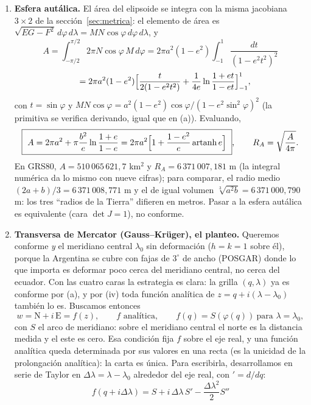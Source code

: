 \begin{enumerate}[label=(\alph*)]
  \(y=S(\varphi)\), el arco de meridiano del capítulo~\ref{cap:elipsoide}. Ni
  conforme ni equivalente: \(\sigma_1=k\), \(\sigma_2=1\).
  \item \textbf{Esfera autálica.} El área del elipsoide se integra con la misma jacobiana
  \(3\times2\) de la sección~\ref{sec:metrica}: el elemento de área es
  \(\sqrt{EG-F^2}\,d\varphi\,d\lambda=MN\cos\varphi\,d\varphi\,d\lambda\), y
  \[
    A=\int_{-\pi/2}^{\pi/2}2\pi N\cos\varphi\,M\,d\varphi
    =2\pi a^2(1-e^2)\int_{-1}^{1}\frac{dt}{(1-e^2t^2)^2}
  \]
  \[
    \phantom{A}=2\pi a^2(1-e^2)\Bigl[\frac{t}{2(1-e^2t^2)}+\frac1{4e}\ln\frac{1+et}{1-et}\Bigr]_{-1}^{1},
  \]
  con \(t=\sin\varphi\) y \(MN\cos\varphi=a^2(1-e^2)\cos\varphi/(1-e^2\sin^2\varphi)^2\)
  (la primitiva se verifica derivando, igual que en (a)). Evaluando,
  \[
    \boxed{\ A=2\pi a^2+\pi\frac{b^2}{e}\ln\frac{1+e}{1-e}
    =2\pi a^2\Bigl[1+\frac{1-e^2}{e}\operatorname{artanh}e\Bigr]\ },
    \qquad R_A=\sqrt{\frac{A}{4\pi}} .
  \]
  En GRS80, \(A=510\,065\,621{,}7\) km\(^2\) y \(R_A=6\,371\,007{,}181\) m (la integral
  numérica da lo mismo con nueve cifras);
  para comparar, el radio medio \((2a+b)/3=6\,371\,008{,}771\) m y el de igual volumen
  \(\sqrt[3]{a^2b}=6\,371\,000{,}790\) m: los tres \enquote{radios de la Tierra} difieren en
  metros. Pasar a la esfera autálica es equivalente (cara \(\det J=1\)), no conforme.
  \item \textbf{Transversa de Mercator (Gauss--Krüger), el planteo.} Queremos conforme
  \emph{y} el meridiano central \(\lambda_0\) sin deformación (\(h=k=1\) sobre él), porque
  la Argentina se cubre con fajas de \(3^\circ\) de ancho (POSGAR) donde lo que importa es
  deformar poco cerca del meridiano central, no cerca del ecuador. Con las cuatro caras la
  estrategia es clara: la grilla \((q,\lambda)\) ya es conforme por (a), y por (iv) toda
  función analítica de \(z=q+i(\lambda-\lambda_0)\) también lo es. Buscamos entonces
  \[
    w=\mathrm N+i\,\mathrm E=f(z),\qquad f \text{ analítica},\qquad
    f(q)=S(\varphi(q))\ \text{para } \lambda=\lambda_0 ,
  \]
  con \(S\) el arco de meridiano: sobre el meridiano central el norte es la distancia
  medida y el este es cero. Esa condición fija \(f\) sobre el eje real, y una función
  analítica queda determinada por sus valores en una recta (es la unicidad de la
  prolongación analítica): la carta es única. Para escribirla, desarrollamos en serie de
  Taylor en \(\Delta\lambda=\lambda-\lambda_0\) alrededor del eje real, con
  \('=d/dq\):
  \[
    f(q+i\Delta\lambda)=S+i\,\Delta\lambda\,S'-\frac{\Delta\lambda^2}2S''
\]
\end{enumerate}
